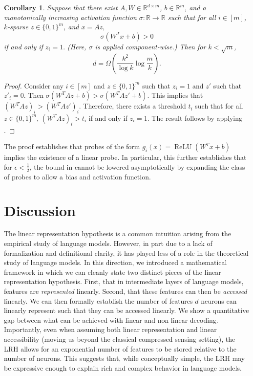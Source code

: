 \documentclass[11pt]{article}
\newtheorem{corollary}[theorem]{Corollary}
\newcommand{\RR}{\mathbb{R}}
\DeclareMathOperator{\ReLU}{ReLU}
\begin{document}
\begin{corollary}\label{cor:activation-bias}
    Suppose that there exist $A,W \in \RR^{d\times m}$, $b\in \RR^m$, and a monotonically increasing activation function $\sigma:\RR\rightarrow \RR$ such that for all $i\in [m]$, $k$-sparse $z\in \{0,1\}^m$, and $x=Az,$
    \begin{equation}\label{eq:coconut}
        \sigma(W^Tx + b) > 0
    \end{equation}
    if and only if $z_i=1.$ (Here, $\sigma$ is applied component-wise.) Then for $k < \sqrt{m}$,
    \begin{equation}
        d = \Omega\left(\frac{k^2}{\log k}\log\frac{m}{k}\right).
    \end{equation}
\end{corollary}
\begin{proof}
    Consider any $i\in [m]$ and $z\in \{0,1\}^m$ such that $z_i = 1$ and $z'$ such that $z'_i = 0.$ Then $\sigma(W^TAz + b) > \sigma(W^TAz' + b).$ This implies that $(W^TAz)_i > (W^TAz')_i.$ Therefore, there exists a threshold $t_i$ such that for all $z\in \{0,1\}^m$, $(W^TAz)_i > t_i$ if and only if $z_i = 1$. The result follows by applying .
\end{proof}

The proof establishes that probes of the form $g_i(x) = \ReLU(W^Tx + b)$ implies the existence of a linear probe. In particular, this further establishes that for $\epsilon < \frac{1}{2}$, the bound in  cannot be lowered asymptotically by expanding the class of probes to allow a bias and activation function.



\section{Discussion}

The linear representation hypothesis is a common intuition arising from the empirical study of language models. However, in part due to a lack of formalization and definitional clarity, it has played less of a role in the theoretical study of language models. In this direction, we introduced a mathematical framework in which we can cleanly state two distinct pieces of the linear representation hypothesis. First, that in intermediate layers of language models, features are \textit{represented} linearly. Second, that these features can then be \textit{accessed} linearly. We can then formally establish the number of features $d$ neurons can linearly represent such that they can be accessed linearly. We show a quantitative gap between what can be achieved with linear and non-linear decoding. Importantly, even when assuming both linear representation and linear accessibility (moving us beyond the classical compressed sensing setting), the LRH allows for an exponential number of features to be stored relative to the number of neurons. This suggests that, while conceptually simple, the LRH may be expressive enough to explain rich and complex behavior in language models.
\end{document}

